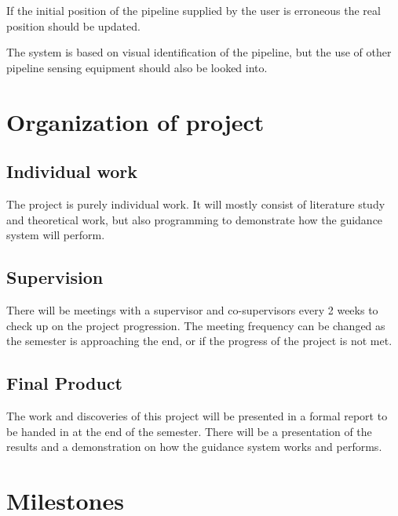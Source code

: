 \documentclass[a4paper,10pt]{article}
\begin{document}
	If the initial position of the pipeline supplied by the user is erroneous the real position should be updated.
	
	The system is based on visual identification of the pipeline, but the use of other pipeline sensing equipment should also be looked into. 
	
\section{Organization of project}
	\subsection{Individual work}
	The project is purely individual work. It will mostly consist of literature study and theoretical work, but also programming to demonstrate how the guidance system will perform.
	
	\subsection{Supervision}
	There will be meetings with a supervisor and co-supervisors every 2 weeks to check up on the project progression. The meeting frequency can be changed as the semester is approaching the end, or if the progress of the project is not met.
	
	\subsection{Final Product}
	The work and discoveries of this project will be presented in a formal report to be handed in at the end of the semester. There will be a presentation of the results and a demonstration on how the guidance system works and performs.

\section{Milestones}
\end{document}
